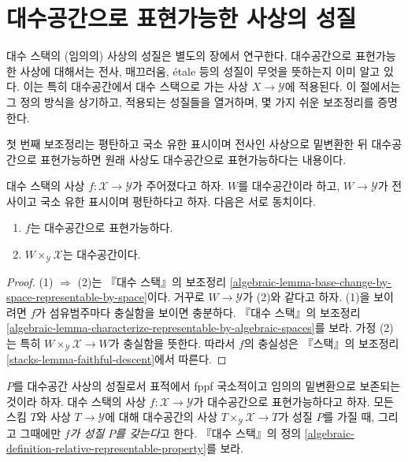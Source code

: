 \section{대수공간으로 표현가능한 사상의 성질}
\label{section-properties-morphisms}

\noindent
대수 스택의 (임의의) 사상의 성질은 별도의 장에서 연구한다.
대수공간으로 표현가능한 사상에 대해서는 전사, 매끄러움, \'etale 등의
성질이 무엇을 뜻하는지 이미 알고 있다. 이는 특히 대수공간에서 대수 스택으로
가는 사상 $X \to \mathcal{Y}$에 적용된다. 이 절에서는 그 정의 방식을
상기하고, 적용되는 성질들을 열거하며, 몇 가지 쉬운 보조정리를 증명한다.

\medskip\noindent
첫 번째 보조정리는 평탄하고 국소 유한 표시이며 전사인 사상으로
밑변환한 뒤 대수공간으로 표현가능하면 원래 사상도
대수공간으로 표현가능하다는 내용이다.

\begin{lemma}
\label{lemma-check-representable-covering}
대수 스택의 사상 $f : \mathcal{X} \to \mathcal{Y}$가 주어졌다고 하자.
$W$를 대수공간이라 하고, $W \to \mathcal{Y}$가 전사이고
국소 유한 표시이며 평탄하다고 하자. 다음은 서로 동치이다.
\begin{enumerate}
\item $f$는 대수공간으로 표현가능하다.
\item $W \times_\mathcal{Y} \mathcal{X}$는 대수공간이다.
\end{enumerate}
\end{lemma}

\begin{proof}
(1) $\Rightarrow$ (2)는 『대수 스택』의 보조정리
\ref{algebraic-lemma-base-change-by-space-representable-by-space}이다.
거꾸로 $W \to \mathcal{Y}$가 (2)와 같다고 하자. (1)을 보이려면
$f$가 섬유범주마다 충실함을 보이면 충분하다. 『대수 스택』의 보조정리
\ref{algebraic-lemma-characterize-representable-by-algebraic-spaces}를
보라. 가정 (2)는 특히
$W \times_\mathcal{Y} \mathcal{X} \to W$가 충실함을 뜻한다.
따라서 $f$의 충실성은 『스택』의 보조정리
\ref{stacks-lemma-faithful-descent}에서 따른다.
\end{proof}

\noindent
$P$를 대수공간 사상의 성질로서 표적에서 fppf 국소적이고
임의의 밑변환으로 보존되는 것이라 하자. 대수 스택의 사상
$f : \mathcal{X} \to \mathcal{Y}$가 대수공간으로 표현가능하다고 하자.
모든 스킴 $T$와 사상 $T \to \mathcal{Y}$에 대해 대수공간의 사상
$T \times_\mathcal{Y} \mathcal{X} \to T$가 성질 $P$를 가질 때, 그리고
그때에만 {\it $f$가 성질 $P$를 갖는다}고 한다. 『대수 스택』의 정의
\ref{algebraic-definition-relative-representable-property}를 보라.

